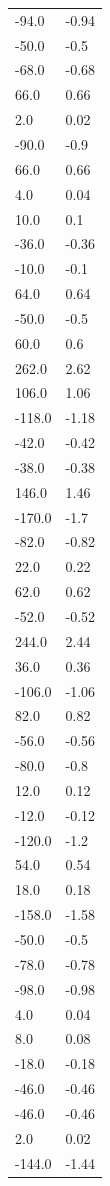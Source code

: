 \begin{longtable}{ll}
-94.0 & -0.94 \\
-50.0 & -0.5 \\
-68.0 & -0.68 \\
66.0 & 0.66 \\
2.0 & 0.02 \\
-90.0 & -0.9 \\
66.0 & 0.66 \\
4.0 & 0.04 \\
10.0 & 0.1 \\
-36.0 & -0.36 \\
-10.0 & -0.1 \\
64.0 & 0.64 \\
-50.0 & -0.5 \\
60.0 & 0.6 \\
262.0 & 2.62 \\
106.0 & 1.06 \\
-118.0 & -1.18 \\
-42.0 & -0.42 \\
-38.0 & -0.38 \\
146.0 & 1.46 \\
-170.0 & -1.7 \\
-82.0 & -0.82 \\
22.0 & 0.22 \\
62.0 & 0.62 \\
-52.0 & -0.52 \\
244.0 & 2.44 \\
36.0 & 0.36 \\
-106.0 & -1.06 \\
82.0 & 0.82 \\
-56.0 & -0.56 \\
-80.0 & -0.8 \\
12.0 & 0.12 \\
-12.0 & -0.12 \\
-120.0 & -1.2 \\
54.0 & 0.54 \\
18.0 & 0.18 \\
-158.0 & -1.58 \\
-50.0 & -0.5 \\
-78.0 & -0.78 \\
-98.0 & -0.98 \\
4.0 & 0.04 \\
8.0 & 0.08 \\
-18.0 & -0.18 \\
-46.0 & -0.46 \\
-46.0 & -0.46 \\
2.0 & 0.02 \\
-144.0 & -1.44 \\

\end{longtable}
